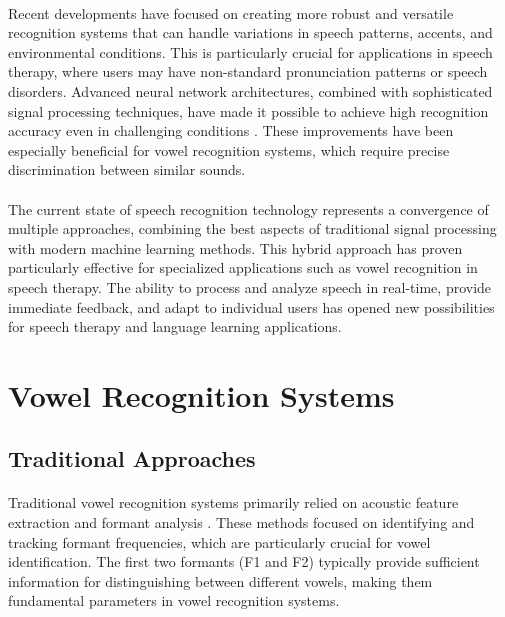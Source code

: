 \paragraph{}
Recent developments have focused on creating more robust and versatile recognition systems that can handle variations in speech patterns, accents, and environmental conditions. This is particularly crucial for applications in speech therapy, where users may have non-standard pronunciation patterns or speech disorders. Advanced neural network architectures, combined with sophisticated signal processing techniques, have made it possible to achieve high recognition accuracy even in challenging conditions \cite{adaptive_learning2023}. These improvements have been especially beneficial for vowel recognition systems, which require precise discrimination between similar sounds.

\paragraph{}
The current state of speech recognition technology represents a convergence of multiple approaches, combining the best aspects of traditional signal processing with modern machine learning methods. This hybrid approach has proven particularly effective for specialized applications such as vowel recognition in speech therapy. The ability to process and analyze speech in real-time, provide immediate feedback, and adapt to individual users has opened new possibilities for speech therapy and language learning applications.

\section{Vowel Recognition Systems}
\label{sec:vowel_recognition}

\subsection{Traditional Approaches}
\label{subsec:traditional}

\paragraph{}
Traditional vowel recognition systems primarily relied on acoustic feature extraction and formant analysis \cite{acoustic_analysis2023}. These methods focused on identifying and tracking formant frequencies, which are particularly crucial for vowel identification. The first two formants (F1 and F2) typically provide sufficient information for distinguishing between different vowels, making them fundamental parameters in vowel recognition systems.

